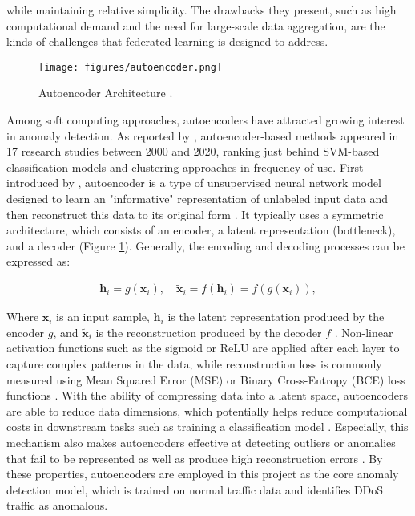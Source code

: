 while maintaining relative simplicity. The drawbacks they present, such as high computational demand and the need for large-scale data aggregation, are the kinds of challenges that federated learning is designed to address.


\begin{figure}[h]
    \centering
    \texttt{[image: figures/autoencoder.png]}
    \caption{Autoencoder Architecture \citep{ibm-autoencoder}.}
    \label{fig:autoencoder_architecture}
\end{figure}

Among soft computing approaches, autoencoders have attracted growing interest in anomaly detection. As reported by \cite{9439459}, autoencoder-based methods appeared in 17 research studies between 2000 and 2020, ranking just behind SVM-based classification models and clustering approaches in frequency of use. First introduced by \cite{10.5555/104279.104293}, autoencoder is a type of unsupervised neural network model designed to learn an "informative" representation of unlabeled input data and then reconstruct this data to its original form \citep{michelucci2022introductionautoencoders}. It typically uses a symmetric architecture, which consists of an encoder, a latent representation (bottleneck), and a decoder (Figure \ref{fig:autoencoder_architecture}). Generally, the encoding and decoding processes can be expressed as:

\begin{align}
\mathbf{h}_i = g(\mathbf{x}_i), \quad \tilde{\mathbf{x}}_i = f(\mathbf{h}_i) = f(g(\mathbf{x}_i)),
\end{align}

Where $\mathbf{x}_i$ is an input sample, $\mathbf{h}_i$ is the latent representation produced by the encoder $g$, and $\tilde{\mathbf{x}}_i$ is the reconstruction produced by the decoder $f$ \citep{michelucci2022introductionautoencoders}. Non-linear activation functions such as the sigmoid or ReLU are applied after each layer to capture complex patterns in the data, while reconstruction loss is commonly measured using Mean Squared Error (MSE) or Binary Cross-Entropy (BCE) loss functions \citep{michelucci2022introductionautoencoders}. With the ability of compressing data into a latent space, autoencoders are able to reduce data dimensions, which potentially helps reduce computational costs in downstream tasks such as training a classification model \citep{michelucci2022introductionautoencoders}. Especially, this mechanism also makes autoencoders effective at detecting outliers or anomalies that fail to be represented as well as produce high reconstruction errors \citep{michelucci2022introductionautoencoders}. By these properties, autoencoders are employed in this project as the core anomaly detection model, which is trained on normal traffic data and identifies DDoS traffic as anomalous.


